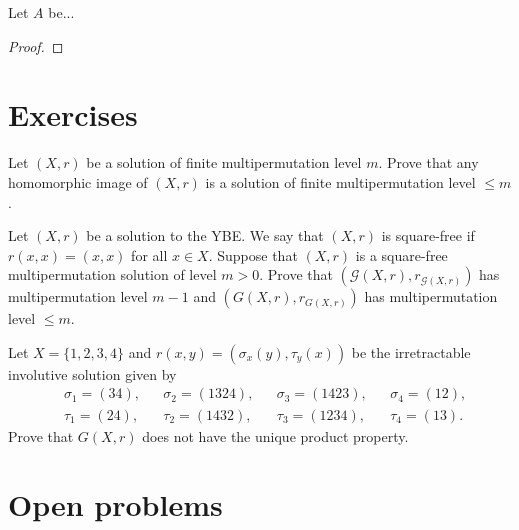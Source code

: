 \begin{theorem}
    Let $A$ be...
\end{theorem}

\begin{proof}

\end{proof}

\section{Exercises}

\begin{prob}
\label{prob:bounded_mpl}
    Let $(X,r)$ be a solution of finite multipermutation level $m$. Prove that any homomorphic image of $(X,r)$ 
    is a solution of finite multipermutation level $\leq m$. 
\end{prob}

\begin{prob}\label{prob:CJKVV}
    Let $(X,r)$ be a solution to the YBE. We say that $(X,r)$ is square-free if $r(x,x)=(x,x)$ for all $x\in X$. Suppose that $(X,r)$ is a square-free multipermutation solution of level $m>0$. Prove that $\left( \mathcal{G}(X,r),r_{\mathcal{G}(X,r)}\right)$ has multipermutation level $m-1$ and $\left( G(X,r),r_{G(X,r)}\right)$ has multipermutation level $\leq m$.
\end{prob}

\begin{prob}
	\label{prob:4-13}
	Let $X=\{1,2,3,4\}$ and $r(x,y)=(\sigma_x(y),\tau_y(x))$ be the irretractable involutive solution given by
	\begin{align*}
		&\sigma_1=(34), && \sigma_2=(1324), && \sigma_3=(1423), && \sigma_4=(12),\\
		&\tau_1=(24), &&\tau_2=(1432), && \tau_3=(1234), && \tau_4=(13).
	\end{align*}
	Prove that $G(X,r)$ 
	does not have the unique product property.
\end{prob}

\section{Open problems}

